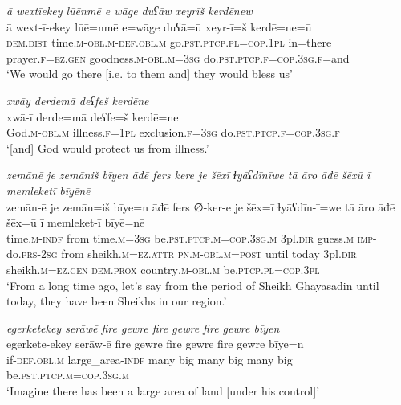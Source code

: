 \ea \label{DG.6}
\textit{ā wextīekey lūēnmē e wāge duʕāw xeyrīš kerdēnew} \\ 
\gll ā wext-ī-ekey lūē=nmē e=wāge duʕā=ū xeyr-ī=š kerdē=ne=ū \\ 
 \textsc{dem.dist} time\textsc{.m}\textsc{-obl}\textsc{.m}\textsc{-def}\textsc{.obl}\textsc{.m} go\textsc{.pst}\textsc{.ptcp}\textsc{.pl}\textsc{=cop}\textsc{.1pl} in=there prayer\textsc{\textsc{.f}}\textsc{=ez}\textsc{.gen} goodness\textsc{.m}\textsc{-obl}\textsc{.m}\textsc{=3sg} do\textsc{.pst}\textsc{.ptcp}\textsc{\textsc{.f}}\textsc{=cop}\textsc{.3sg}\textsc{\textsc{.f}}=and \\ 
\glt `We would go there [i.e. to them and] they would bless us'
\z 
 
\ea \label{DG.7}
\textit{xwāy derdemā deʕfeš kerdēne} \\ 
\gll xwā-ī derde=mā deʕfe=š kerdē=ne \\ 
 God\textsc{.m}\textsc{-obl}\textsc{.m} illness\textsc{\textsc{.f}}\textsc{=1pl} exclusion\textsc{\textsc{.f}}\textsc{=3sg} do\textsc{.pst}\textsc{.ptcp}\textsc{\textsc{.f}}\textsc{=cop}\textsc{.3sg}\textsc{\textsc{.f}} \\ 
\glt `[and] God would protect us from illness.'
\z 
 
\ea \label{DG.8}
\textit{zemānē je zemāniš bīyen āđē fers kere je šēxī ɫyāʕdīnīwe tā āro āđē šēxū ī memleketī bīyēnē} \\ 
\gll zemān-ē je zemān=iš bīye=n āđē fers ∅-ker-e je šēx=ī ɫyāʕdīn-ī=we tā āro āđē šēx=ū ī memleket-ī bīyē=nē \\ 
 time\textsc{.m}\textsc{-indf} from time\textsc{.m}\textsc{=3sg} be\textsc{.pst}\textsc{.ptcp}\textsc{.m}\textsc{=cop}\textsc{.3sg}\textsc{.m} 3pl\textsc{.dir} guess\textsc{.m} \textsc{imp-}do\textsc{.prs}-\textsc{2sg} from sheikh\textsc{.m}\textsc{=ez}.\textsc{attr} \textsc{pn}\textsc{.m}\textsc{-obl}\textsc{.m}\textsc{=\textsc{post}} until today 3pl\textsc{.dir} sheikh\textsc{.m}\textsc{=ez}\textsc{.gen} \textsc{dem.prox} country\textsc{.m}\textsc{-obl}\textsc{.m} be\textsc{.ptcp}\textsc{.pl}\textsc{=cop}\textsc{.3pl} \\ 
\glt `From a long time ago, let’s say from the period of Sheikh Ghayasadin until today, they have been Sheikhs in our region.'
\z 
 
\ea \label{DG.9}
\textit{egerketekey serāwē fire gewre fire gewre fire gewre bīyen} \\ 
\gll egerkete-ekey serāw-ē fire gewre fire gewre fire gewre bīye=n \\ 
 if\textsc{-def}\textsc{.obl}\textsc{.m} large\_area\textsc{-indf} many big many big many big be\textsc{.pst}\textsc{.ptcp}\textsc{.m}\textsc{=cop}\textsc{.3sg}\textsc{.m} \\ 
\glt `Imagine there has been a large area of land [under his control]'
\z 
 
